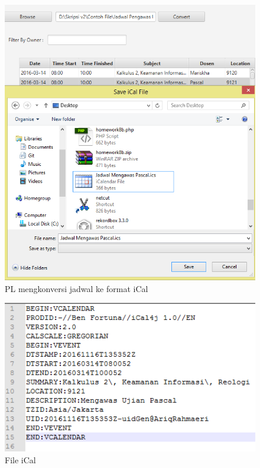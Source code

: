 		\begin{figure}[H]
		\centering
		\includegraphics[scale=0.6]{Gambar/konversiiCal}
		\caption{PL mengkonversi jadwal ke format iCal}
		\label{fig:konversiiCal}
		\end{figure}
		
		\begin{figure}[H]
		\centering
		\includegraphics[scale=0.8]{Gambar/fileiCal}
		\caption{File iCal}
		\label{fig:fileiCal}
		\end{figure}

